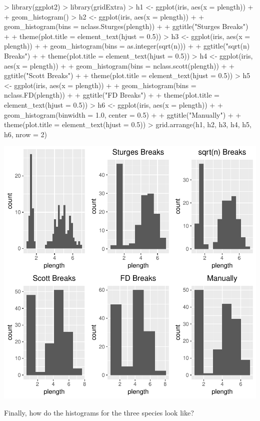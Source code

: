 \documentclass[12pt,letterpaper,final]{article}
\begin{document}
\begin{Schunk}
\begin{Sinput}
> library(ggplot2)
> library(gridExtra)
> h1 <- ggplot(iris, aes(x = plength)) +
+   geom_histogram()
> h2 <- ggplot(iris, aes(x = plength)) +
+   geom_histogram(bins = nclass.Sturges(plength)) +
+   ggtitle("Sturges Breaks") +
+   theme(plot.title = element_text(hjust = 0.5))
> h3 <- ggplot(iris, aes(x = plength)) +
+   geom_histogram(bins = as.integer(sqrt(n))) +
+   ggtitle("sqrt(n) Breaks") +
+   theme(plot.title = element_text(hjust = 0.5))
> h4 <- ggplot(iris, aes(x = plength)) +
+   geom_histogram(bins = nclass.scott(plength)) +
+   ggtitle("Scott Breaks") +
+   theme(plot.title = element_text(hjust = 0.5))
> h5 <- ggplot(iris, aes(x = plength)) +
+   geom_histogram(bins = nclass.FD(plength)) +
+   ggtitle("FD Breaks") +
+   theme(plot.title = element_text(hjust = 0.5))
> h6 <- ggplot(iris, aes(x = plength)) +
+   geom_histogram(binwidth = 1.0, center = 0.5) +
+   ggtitle("Manually") +
+   theme(plot.title = element_text(hjust = 0.5))
> grid.arrange(h1, h2, h3, h4, h5, h6,  nrow = 2)
\end{Sinput}
\end{Schunk}
\includegraphics{lect_main-005}

Finally, how do the histograms for the three species look like?
\end{document}
